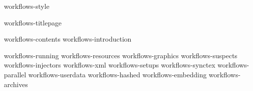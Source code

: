 
%
%


\environment workflows-style

\startdocument
  [metadata:author=Hans Hagen,
   metadata:title=Workflow support in context,
   author=Hans Hagen,
   affiliation=PRAGMA ADE,
   location=Hasselt NL,
   title=workflow,
   extra=support in context,
   support=www.contextgarden.net,
   website=www.pragma-ade.nl]

\component workflows-titlepage

\startfrontmatter
    \component workflows-contents
    \component workflows-introduction
\stopfrontmatter

\startbodymatter
    \component workflows-running
    \component workflows-resources
    \component workflows-graphics
    \component workflows-suspects
    \component workflows-injectors
    \component workflows-xml
    \component workflows-setups
    \component workflows-synctex
    \component workflows-parallel
    \component workflows-userdata
    \component workflows-hashed
    \component workflows-embedding
    \component workflows-archives
\stopbodymatter

\stopdocument

